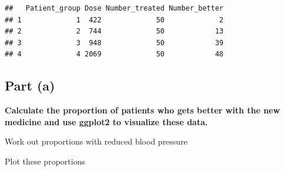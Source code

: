 \documentclass[
]{article}
\newenvironment{Shaded}{\begin{snugshade}}{\end{snugshade}}
\newcommand{\DataTypeTok}[1]{\textcolor[rgb]{0.13,0.29,0.53}{#1}}
\newcommand{\KeywordTok}[1]{\textcolor[rgb]{0.13,0.29,0.53}{\textbf{#1}}}
\newcommand{\NormalTok}[1]{#1}
\newcommand{\OperatorTok}[1]{\textcolor[rgb]{0.81,0.36,0.00}{\textbf{#1}}}
\newcommand{\StringTok}[1]{\textcolor[rgb]{0.31,0.60,0.02}{#1}}
\begin{document}
\begin{verbatim}
##   Patient_group Dose Number_treated Number_better
## 1             1  422             50             2
## 2             2  744             50            13
## 3             3  948             50            39
## 4             4 2069             50            48
\end{verbatim}

\hypertarget{part-a-1}{%
\subsection{\texorpdfstring{\textbf{Part
(a)}}{Part (a)}}\label{part-a-1}}

\textbf{Calculate the proportion of patients who gets better with the
new medicine and use ggplot2 to visualize these data.}

Work out proportions with reduced blood pressure

\begin{Shaded}
\end{Shaded}

Plot these proportions
\end{document}

